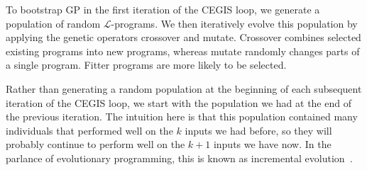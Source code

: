 \documentclass[preprint]{sigplanconf}
\theoremstyle{definition}
\begin{document}
To bootstrap GP in the first iteration of the CEGIS loop, we generate a population
of random $\mathcal{L}$-programs. We then iteratively evolve this population by
applying the genetic operators {\sc crossover} and {\sc mutate}.
{\sc Crossover} combines selected existing programs into new programs,
whereas {\sc mutate} randomly changes parts of a single program.
Fitter programs are more likely to be selected.




Rather than generating a random population at the beginning of each subsequent
iteration of the CEGIS loop, we start with the population we had at the end of the
previous iteration.  The intuition here is that this population contained
many individuals that performed well on the $k$ inputs we had before, so
they will probably continue to perform well on the $k+1$ inputs we have now.
In the parlance of evolutionary programming, this is known as
incremental evolution~\cite{Gomez97incrementalevolution}.

\end{document}
